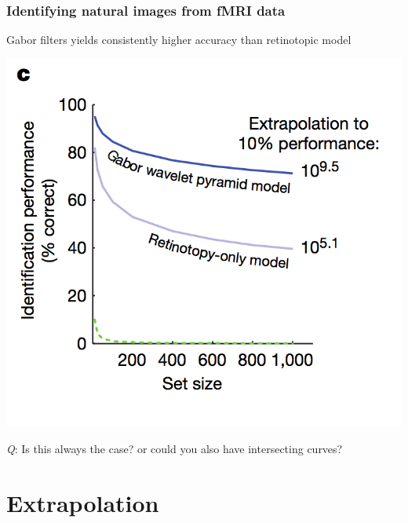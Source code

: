 \documentclass{beamer}
\begin{document}
\begin{frame}
\frametitle{Identifying natural images from fMRI data}
Gabor filters yields consistently higher accuracy than retinotopic model
\begin{center}
\includegraphics[scale = 0.25]{kay_extrapolation.png}
\end{center}
\pause
\emph{Q}: Is this always the case? or could you also have intersecting curves?
\end{frame}

\section{Extrapolation}

\begin{frame}
\sectionpage
\end{frame}
\end{document}
